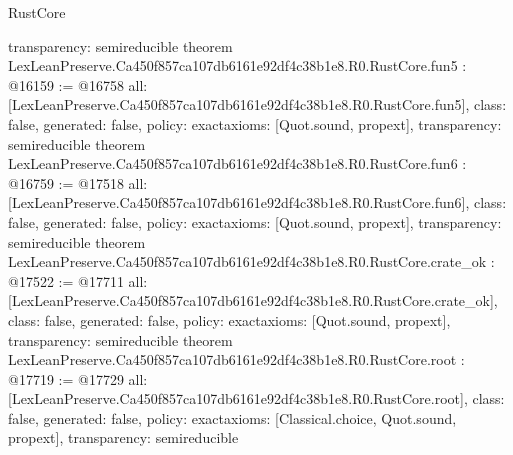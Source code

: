 \begin{lexlean}{RustCore}
\begin{coremodule}
{  transparency: semireducible
}
theorem LexLeanPreserve.Ca450f857ca107db6161e92df4c38b1e8.R0.RustCore.fun5 : @16159 := @16758 {
  all: [LexLeanPreserve.Ca450f857ca107db6161e92df4c38b1e8.R0.RustCore.fun5],
  class: false,
  generated: false,
  policy: exact{axioms: [Quot.sound, propext]},
  transparency: semireducible
}
theorem LexLeanPreserve.Ca450f857ca107db6161e92df4c38b1e8.R0.RustCore.fun6 : @16759 := @17518 {
  all: [LexLeanPreserve.Ca450f857ca107db6161e92df4c38b1e8.R0.RustCore.fun6],
  class: false,
  generated: false,
  policy: exact{axioms: [Quot.sound, propext]},
  transparency: semireducible
}
theorem LexLeanPreserve.Ca450f857ca107db6161e92df4c38b1e8.R0.RustCore.crate_ok : @17522 := @17711 {
  all: [LexLeanPreserve.Ca450f857ca107db6161e92df4c38b1e8.R0.RustCore.crate_ok],
  class: false,
  generated: false,
  policy: exact{axioms: [Quot.sound, propext]},
  transparency: semireducible
}
theorem LexLeanPreserve.Ca450f857ca107db6161e92df4c38b1e8.R0.RustCore.root : @17719 := @17729 {
  all: [LexLeanPreserve.Ca450f857ca107db6161e92df4c38b1e8.R0.RustCore.root],
  class: false,
  generated: false,
  policy: exact{axioms: [Classical.choice, Quot.sound, propext]},
  transparency: semireducible
}


\end{coremodule}
\end{lexlean}
